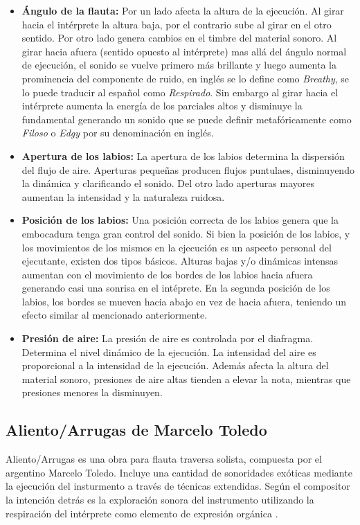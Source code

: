 \documentclass{article}
\begin{document}
\begin{itemize}
  \item \textbf{Ángulo de la flauta:} Por un lado afecta la altura de la ejecución. Al girar hacia el intérprete la altura baja, por el contrario sube al girar en el otro sentido. Por otro lado genera cambios en el timbre del material sonoro. Al girar hacia afuera (sentido opuesto al intérprete) mas allá del ángulo normal de ejecución, el sonido se vuelve primero más brillante y luego aumenta la prominencia del componente de ruido, en inglés se lo define como \textit {Breathy}, se lo puede traducir al español como \textit{Respirado}. Sin embargo al girar hacia el intérprete aumenta la energía de los parciales altos y disminuye la fundamental generando un sonido que se puede definir metafóricamente como \textit{Filoso} o \textit{Edgy} por su denominación en inglés.
  \item \textbf{Apertura de los labios:} La apertura de los labios determina la dispersión del flujo de aire. Aperturas pequeñas producen flujos puntulaes, disminuyendo la dinámica y clarificando el sonido. Del otro lado aperturas mayores aumentan la intensidad y la naturaleza ruidosa.   
  \item \textbf{Posición de los labios:} Una posición correcta de los labios genera que la embocadura tenga gran control del sonido. Si bien la posición de los labios, y los movimientos de los mismos en la ejecución es un aspecto personal del ejecutante, existen dos tipos básicos. Alturas bajas y/o dinámicas intensas aumentan con el movimiento de los bordes de los labios hacia afuera generando casi una sonrisa en el intéprete. En la segunda posición de los labios, los bordes se mueven hacia abajo en vez de hacia afuera, teniendo un efecto similar al mencionado anteriormente.	
  \item \textbf{Presión de aire:} La presión de aire es controlada por el diafragma. Determina el nivel dinámico de la ejecución. La intensidad del aire es proporcional a la intensidad de la ejecución. Además afecta la altura del material sonoro, presiones de aire altas tienden a elevar la nota, mientras que presiones menores la disminuyen.	
\end{itemize}
\medskip 

\subsection{Aliento/Arrugas de Marcelo Toledo}
Aliento/Arrugas es una obra para flauta traversa solista, compuesta por el argentino Marcelo Toledo. Incluye una cantidad de sonoridades exóticas mediante la ejecución del insturmento a través de técnicas extendidas. Según el compositor la intención detrás es la exploración sonora del instrumento utilizando la respiración del intérprete como elemento de expresión orgánica \citep{candelaria2005argentine}.  
\medskip
\end{document}
